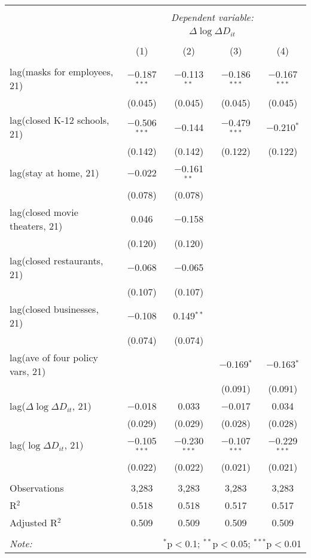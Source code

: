 \begin{tabular}{@{\extracolsep{1pt}}lcccc} 
\\[-1.8ex]\hline 
\hline \\[-1.8ex] 
 & \multicolumn{4}{c}{\textit{Dependent variable:}} \\ 
\cline{2-5} 
 & \multicolumn{4}{c}{$\Delta \log \Delta D_{it}$} \\ 
\\[-1.8ex] & (1) & (2) & (3) & (4)\\ 
\hline \\[-1.8ex] 
 lag(masks for employees, 21) & $-$0.187$^{***}$ & $-$0.113$^{**}$ & $-$0.186$^{***}$ & $-$0.167$^{***}$ \\ 
  & (0.045) & (0.045) & (0.045) & (0.045) \\ 
  lag(closed K-12 schools, 21) & $-$0.506$^{***}$ & $-$0.144 & $-$0.479$^{***}$ & $-$0.210$^{*}$ \\ 
  & (0.142) & (0.142) & (0.122) & (0.122) \\ 
  lag(stay at home, 21) & $-$0.022 & $-$0.161$^{**}$ &  &  \\ 
  & (0.078) & (0.078) &  &  \\ 
  lag(closed movie theaters, 21) & 0.046 & $-$0.158 &  &  \\ 
  & (0.120) & (0.120) &  &  \\ 
  lag(closed restaurants, 21) & $-$0.068 & $-$0.065 &  &  \\ 
  & (0.107) & (0.107) &  &  \\ 
  lag(closed businesses, 21) & $-$0.108 & 0.149$^{**}$ &  &  \\ 
  & (0.074) & (0.074) &  &  \\ 
  lag(ave of four policy vars, 21) &  &  & $-$0.169$^{*}$ & $-$0.163$^{*}$ \\ 
  &  &  & (0.091) & (0.091) \\ 
  lag($\Delta \log \Delta D_{it}$, 21) & $-$0.018 & 0.033 & $-$0.017 & 0.034 \\ 
  & (0.029) & (0.029) & (0.028) & (0.028) \\ 
  lag($\log \Delta D_{it}$, 21) & $-$0.105$^{***}$ & $-$0.230$^{***}$ & $-$0.107$^{***}$ & $-$0.229$^{***}$ \\ 
  & (0.022) & (0.022) & (0.021) & (0.021) \\ 
 \hline \\[-1.8ex] 
Observations & 3,283 & 3,283 & 3,283 & 3,283 \\ 
R$^{2}$ & 0.518 & 0.518 & 0.517 & 0.517 \\ 
Adjusted R$^{2}$ & 0.509 & 0.509 & 0.509 & 0.509 \\ 
\hline 
\hline \\[-1.8ex] 
\textit{Note:}  & \multicolumn{4}{r}{$^{*}$p$<$0.1; $^{**}$p$<$0.05; $^{***}$p$<$0.01} \\ 
\end{tabular} 